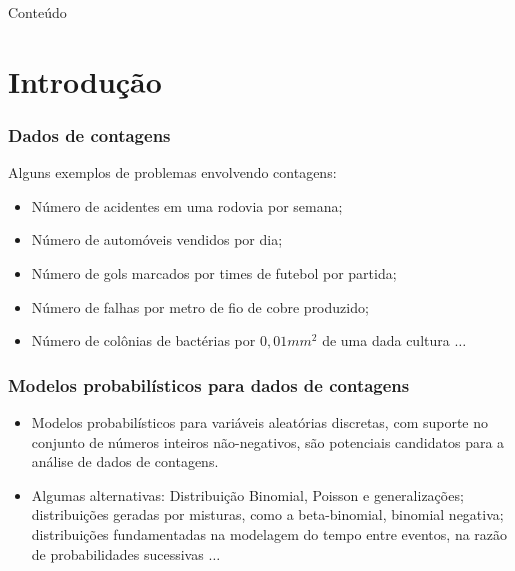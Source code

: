 \documentclass[10pt, aspectratio=169]{beamer}\usepackage[]{graphicx}\usepackage[]{color}
\begin{document}
\begin{frame}{Conteúdo}
\begin{multicols}{2}
  \tableofcontents
\end{multicols}
\end{frame}




\section{Introdução}
\label{intro}

\begin{frame}
\frametitle{Dados de contagens}
Alguns exemplos de problemas envolvendo contagens:

\vspace{0,2cm}
\begin{itemize}
\item Número de acidentes em uma rodovia por semana;
\item Número de automóveis vendidos por dia;
\item Número de gols marcados por times de futebol por partida;
\item Número de falhas por metro de fio de cobre produzido;
\item Número de colônias de bactérias por $0,01mm^{2}$ de uma dada 
cultura $\ldots$

\end{itemize}
\end{frame}

\begin{frame}
\frametitle{Modelos probabilísticos para dados de contagens}

\begin{itemize}
    \item Modelos probabilísticos para variáveis aleatórias discretas, 
    com suporte no conjunto de números inteiros não-negativos, 
    são potenciais candidatos para a análise de dados de contagens.
\vspace{0.5cm}
    \item Algumas alternativas: Distribuição Binomial, Poisson e 
    generalizações; distribuições geradas por misturas, como a 
    beta-binomial, binomial negativa; distribuições fundamentadas na 
    modelagem do tempo entre eventos, na razão de probabilidades 
    sucessivas $\ldots$

\end{itemize}
\end{frame}
\end{document}
